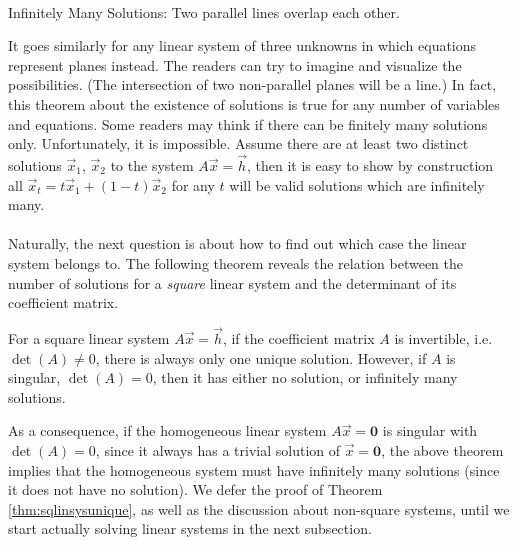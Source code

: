 \begin{center}
 \\
Infinitely Many Solutions: Two parallel lines overlap each other. 
\end{center}
It goes similarly for any linear system of three unknowns in which equations represent planes instead. The readers can try to imagine and visualize the possibilities. (The intersection of two non-parallel planes will be a line.) In fact, this theorem about the existence of solutions is true for any number of variables and equations. Some readers may think if there can be finitely many solutions only. Unfortunately, it is impossible. Assume there are at least two distinct solutions $\vec{x}_1$, $\vec{x}_2$ to the system $A\vec{x} = \vec{h}$, then it is easy to show by construction all $\vec{x}_t = t\vec{x}_1 + (1-t)\vec{x}_2$ for any $t$ will be valid solutions which are infinitely many. \\ 
\\
Naturally, the next question is about how to find out which case the linear system belongs to. The following theorem reveals the relation between the number of solutions for a \textit{square} linear system and the determinant of its coefficient matrix.
\begin{thm}
\label{thm:sqlinsysunique}
For a square linear system $A\vec{x} = \vec{h}$, if the coefficient matrix $A$ is invertible, i.e.\ $\det(A) \neq 0$, there is always only one unique solution. However, if $A$ is singular, $\det(A) = 0$, then it has either no solution, or infinitely many solutions.
\end{thm}
As a consequence, if the homogeneous linear system $A\vec{x} = \textbf{0}$ is singular with $\det(A) = 0$, since it always has a trivial solution of $\vec{x} = \textbf{0}$, the above theorem implies that the homogeneous system must have infinitely many solutions (since it does not have no solution). We defer the proof of Theorem \ref{thm:sqlinsysunique}, as well as the discussion about non-square systems, until we start actually solving linear systems in the next subsection. \\
